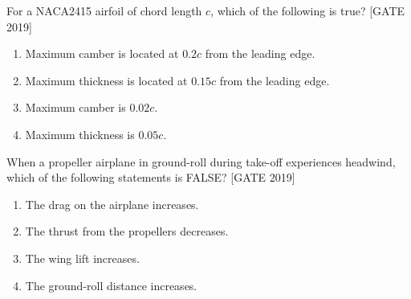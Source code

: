     \item For a NACA2415 airfoil of chord length $c$, which of the following is true?
    \hfill{[GATE 2019]}

        \begin{enumerate}
            \item Maximum camber is located at $0.2c$ from the leading edge.
            \item Maximum thickness is located at $0.15c$ from the leading edge.
            \item Maximum camber is $0.02c$.
            \item Maximum thickness is $0.05c$.\\
        \end{enumerate}

\item When a propeller airplane in ground-roll during take-off experiences headwind, which of the following statements is FALSE?
    \hfill{[GATE 2019]}
    \begin{multicols}{2}
        \begin{enumerate}
            \item The drag on the airplane increases.
            \item The thrust from the propellers decreases.
            \item The wing lift increases.
            \item The ground-roll distance increases.
        \end{enumerate}
    \end{multicols}

